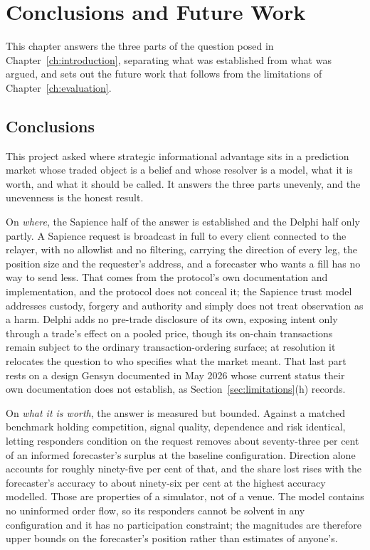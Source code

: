 \chapter{Conclusions and Future Work}
\label{ch:conclusions}


This chapter answers the three parts of the question posed in Chapter~\ref{ch:introduction},
separating what was established from what was argued, and sets out the future work that
follows from the limitations of Chapter~\ref{ch:evaluation}.

\section{Conclusions}

This project asked where strategic informational advantage sits in a prediction market whose
traded object is a belief and whose resolver is a model, what it is worth, and what it
should be called. It answers the three parts unevenly, and the unevenness is the honest
result.

On \emph{where}, the Sapience half of the answer is established and the Delphi half only
partly. A Sapience request is broadcast in full to every client connected to the relayer,
with no allowlist and no filtering, carrying the direction of every leg, the position size
and the requester's address, and a forecaster who wants a fill has no way to send less. That
comes from the protocol's own documentation and implementation, and the protocol does not
conceal it; the Sapience trust model addresses custody, forgery and authority and simply
does not treat observation as a harm. Delphi adds no pre-trade disclosure of its own,
exposing intent only through a trade's effect on a pooled price, though its on-chain
transactions remain subject to the ordinary transaction-ordering surface; at resolution it
relocates the question to who specifies what the market meant. That last part rests on a
design Gensyn documented in May 2026 whose current status their own documentation does not
establish, as Section~\ref{sec:limitations}(h) records.

On \emph{what it is worth}, the answer is measured but bounded. Against a matched benchmark
holding competition, signal quality, dependence and risk identical, letting responders
condition on the request removes about seventy-three per cent of an informed forecaster's
surplus at the baseline configuration. Direction alone accounts for roughly ninety-five per
cent of that, and the share lost rises with the forecaster's accuracy to about ninety-six
per cent at the highest accuracy modelled. Those are properties of a simulator, not of a
venue. The model contains no uninformed order flow, so its responders cannot be solvent in
any configuration and it has no participation constraint; the magnitudes are therefore upper
bounds on the forecaster's position rather than estimates of anyone's.

